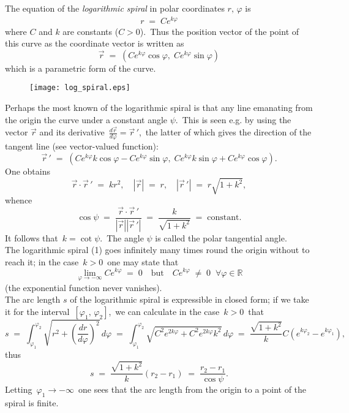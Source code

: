 \documentclass[12pt]{article}
\theoremstyle{definition}
\begin{document}
The equation of the \emph{logarithmic spiral} in polar coordinates $r,\,\varphi$ is
\begin{align}
r \;=\; Ce^{k\varphi}
\end{align}
where $C$ and $k$ are constants ($C > 0$).\, Thus the position vector of the point of this curve as the coordinate vector is written as
$$\vec{r} \;=\; (Ce^{k\varphi}\cos\varphi,\;Ce^{k\varphi}\sin\varphi)$$
which is a parametric form of the curve.\\

\begin{figure}[htp]
\centering
\texttt{[image: log\_spiral.eps]}
\end{figure}

Perhaps the most known  of the logarithmic spiral is that any line emanating from the origin  the curve under a constant angle $\psi$.\, This is seen e.g. by using the vector $\vec{r}$ and its derivative \,$\frac{d\vec{r}}{d\varphi} = \vec{r}\,'$,\, the latter of which gives the direction of the tangent line (see vector-valued function):
$$\vec{r}\,' \;=\; 
\left(Ce^{k\varphi}k\cos\varphi-Ce^{k\varphi}\sin\varphi,\; Ce^{k\varphi}k\sin\varphi+Ce^{k\varphi}\cos\varphi\right).$$
One obtains
$$\vec{r}\cdot\vec{r}\,' \;=\; kr^2, \quad |\vec{r}| \;=\; r, \quad |\vec{r}\,'| \;=\; r\sqrt{1\!+\!k^2},$$
whence
$$\cos\psi \;=\; \frac{\vec{r}\cdot\vec{r}\,'}{|\vec{r}||\vec{r}\,'|} \;=\; \frac{k}{\sqrt{1\!+\!k^2}} 
\;=\; \mbox{constant.}$$ 
It follows that \,$k = \cot\psi$.\, The angle $\psi$ is called the polar tangential angle.\\

The logarithmic spiral (1) goes infinitely many times round the origin without to reach it; in the case \,$k > 0$\, one
may state that
$$\lim_{\varphi\to-\infty}Ce^{k\varphi} \;=\; 0 \quad\mbox{but}\quad Ce^{k\varphi} \;\neq\; 0 \;\;
\forall \varphi \in \mathbb{R}$$
(the exponential function never vanishes).\\


The arc length $s$ of the logarithmic spiral is expressible in closed form; if we take it for the interval 
\,$[\varphi_1,\,\varphi_2]$,\, we can calculate in the case \,$k > 0$\, that
$$ s \;=\; \int_{\varphi_1}^{\varphi_2}\!\sqrt{r^2+\left(\frac{dr}{d\varphi}\right)^2}\,d\varphi \;=\;
\int_{\varphi_1}^{\varphi_2}\!\sqrt{C^2e^{2k\varphi}+C^2e^{2k\varphi}k^2}\,d\varphi \;=\; 
\frac{\sqrt{1\!+\!k^2}}{k}C(e^{k\varphi_2}-e^{k\varphi_1}),$$
thus
$$s \;=\; \frac{\sqrt{1\!+\!k^2}}{k}(r_2\!-\!r_1) \;=\; \frac{r_2\!-\!r_1}{\cos\psi}.$$
Letting\, $\varphi_1 \to -\infty$\, one sees that the arc length from the origin to a point of the spiral is finite.\\
\end{document}
